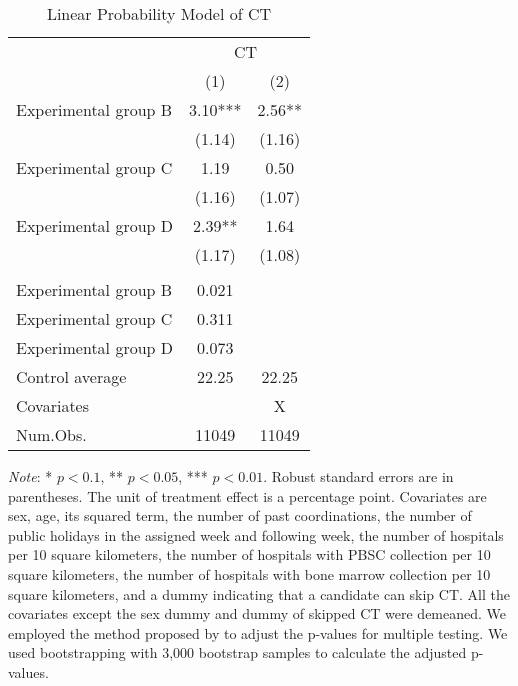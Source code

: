 \documentclass[12pt, a4paper]{article}
\begin{document}
\begin{table}
\centering\centering
\caption{\label{tab:lm-test}Linear Probability Model of CT}
\centering
\fontsize{8}{10}\selectfont
\begin{threeparttable}
\begin{tabular}[t]{>{\raggedright\arraybackslash}p{20em}cc}
\toprule
\multicolumn{1}{c}{ } & \multicolumn{2}{c}{CT} \\
\cmidrule(l{3pt}r{3pt}){2-3}
  & (1) & (2)\\
\midrule
Experimental group B & \num{3.10}*** & \num{2.56}**\\
 & (\num{1.14}) & (\num{1.16})\\
Experimental group C & \num{1.19} & \num{0.50}\\
 & (\num{1.16}) & (\num{1.07})\\
Experimental group D & \num{2.39}** & \num{1.64}\\
 & (\num{1.17}) & (\num{1.08})\\
\midrule
\addlinespace[0.3em]
\multicolumn{3}{l}{\textit{Adjustment of p-values for multiple testing}}\\
\hspace{1em}Experimental group B & 0.021 & \\
\hspace{1em}Experimental group C & 0.311 & \\
\hspace{1em}Experimental group D & 0.073 & \\
Control average & 22.25 & 22.25\\
Covariates &  & X\\
Num.Obs. & \num{11049} & \num{11049}\\
\bottomrule
\end{tabular}
\begin{tablenotes}
\item \emph{Note}: * $p < 0.1$, ** $p < 0.05$, *** $p < 0.01$. Robust standard errors are in parentheses. The unit of treatment effect is a percentage point. Covariates are sex, age, its squared term, the number of past coordinations, the number of public holidays in the assigned week and following week, the number of hospitals per 10 square kilometers, the number of hospitals with PBSC collection per 10 square kilometers, the number of hospitals with bone marrow collection per 10 square kilometers, and a dummy indicating that a candidate can skip CT. All the covariates except the sex dummy and dummy of skipped CT were demeaned. We employed the method proposed by \citet{List2019} to adjust the p-values for multiple testing. We used bootstrapping with 3,000 bootstrap samples to calculate the adjusted p-values.
\end{tablenotes}
\end{threeparttable}
\end{table}
\end{document}
